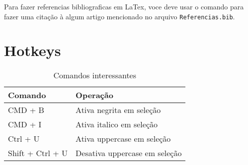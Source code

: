 Para fazer referencias bibliograficas em LaTex, voce deve usar o comando \cite{dirac} para fazer uma citação à algum artigo mencionado no arquivo \texttt{Referencias.bib}.

\cite{website:ArduinoLabview}
\cite{website:OPENSOURCESW}
\cite{website:OPENSOURCEHW}


\section{Hotkeys}

\begin{table}[h]
    \centering
    \begin{tabular}{| l | l |}
        \hline
        \textbf{Comando} & \textbf{Operação} \\
        \hline
        CMD + B & Ativa negrita em seleção \\
        CMD + I & Ativa italico em seleção \\
        Ctrl + U & Ativa uppercase em seleção \\
        Shift + Ctrl + U & Desativa uppercase em seleção \\
        \hline
    \end{tabular}
    \caption{Comandos interessantes}
    \label{tab:my_label}
\end{table}